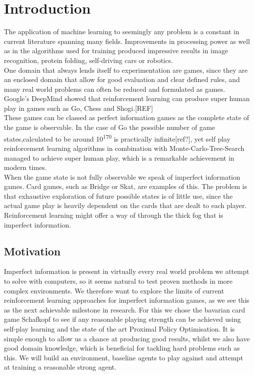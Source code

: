 \chapter{Introduction}
The application of machine learning to seemingly any problem is a constant in current literature spanning many
fields.
Improvements in processing power as well as in the algorithms used for training produced impressive results in image
recognition, protein folding, self-driving cars or robotics.\\
One domain that always lends itself to experimentation are games, since they are an enclosed domain that allow for
good evaluation and clear defined rules, and many real world problems can often be reduced and formulated as games.
\newline
Google's DeepMind showed that reinforcement learning can produce super human play in games such as Go, Chess and
Shogi.[REF]\\
These games can be classed as perfect information games as the complete state of the game is observable.
In the case of Go the possible number of game states,calculated to be around 10\textsuperscript{170} is practically
infinite[ref?], yet self play reinforcement learning algorithms in combination with Monte-Carlo-Tree-Search managed
to achieve super human play, which is a remarkable achievement in
modern times.\\
When the game state is not fully observable we speak of imperfect information games.
Card games, such as Bridge or Skat, are examples of this.
The problem is that exhaustive exploration of future possible states is of little use, since the actual game play is
heavily dependent on the cards that are dealt to each player.\\
Reinforcement learning might offer a way of through the thick fog that is imperfect information.


\section{Motivation}
Imperfect information is present in virtually every real world problem we attempt to solve with computers, so it
seems natural to test proven methods in more complex environments.
We therefore want to explore the limits of current reinforcement learning approaches for imperfect information games, as
we see this as the next achievable milestone in research.
For this we chose the bavarian card game Schafkopf to see if any reasonable playing strength can be achieved using
self-play learning and the state of the art Proximal Policy Optimisation.
It is simple enough to allow us a chance at producing good results, whilst we also have good domain knowledge, which
is beneficial for tackling hard problems such as this.
We will build an environment, baseline agents to play against and attempt at training a reasonable strong agent.